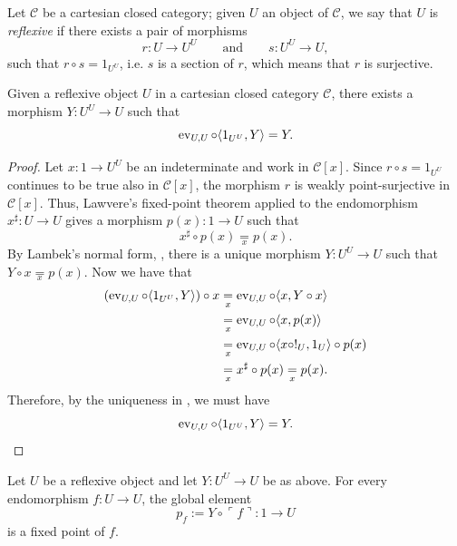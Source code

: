 \begin{definition}
    Let $\mathcal C$ be a cartesian closed category; given $U$ an object of $\mathcal C$, we say that $U$ is \emph{reflexive} if there exists a pair of morphisms
    \[ r : U \to U^U \qquad\text{and}\qquad s : U^U \to U, \]
    such that $r \circ s = 1_{U^U}$, i.e. $s$ is a section of $r$, which means that $r$ is surjective.
\end{definition}

\begin{theorem}
    Given a reflexive object $U$ in a cartesian closed category $\mathcal C$, there exists a morphism $Y : U^U \to U$ such that
    \[ \operatorname{ev}_{U,U} \circ \langle 1_{U^U},Y \rangle = Y. \]
\end{theorem}

\begin{proof}
    Let $x:1\to U^U$ be an indeterminate and work in $\mathcal C[x]$. Since $r\circ s=1_{U^U}$ continues to be true also in $\mathcal C[x]$, the morphism $r$ is weakly point-surjective in $\mathcal C[x]$.
    Thus, Lawvere's fixed-point theorem applied to the endomorphism $x^\sharp:U\to U$ gives a morphism $p(x):1\to U$ such that
    \[ x^\sharp\circ p(x)\underset{x}{=}p(x). \]
    By Lambek's normal form, , there is a unique morphism $Y:U^U\to U$ such that $Y \circ x \underset{x}{=} p(x)$.
    Now we have that
    \begin{align*}
        (\operatorname{ev}_{U,U}\circ\langle 1_{U^U},Y\rangle)\circ x
        &\underset{x}{=}\operatorname{ev}_{U,U}\circ\langle x,Y\circ x\rangle \\
        &\underset{x}{=}\operatorname{ev}_{U,U}\circ\langle x,p(x)\rangle \\
        &\underset{x}{=} \operatorname{ev}_{U,U} \circ \langle x \circ !_U, 1_U \rangle \circ p(x) \\
        &\underset{x}{=} x^\sharp \circ p(x) \underset{x}{=} p(x).
    \end{align*}
    Therefore, by the uniqueness in , we must have
    \[ \operatorname{ev}_{U,U} \circ \langle 1_{U^U}, Y \rangle = Y. \]
\end{proof}

\begin{corollary}
    Let $U$ be a reflexive object and let $Y:U^U\to U$ be as above. For every endomorphism $f:U\to U$, the global element
    \[ p_f:=Y\circ\ulcorner f\urcorner:1\to U \]
    is a fixed point of $f$.
\end{corollary}

